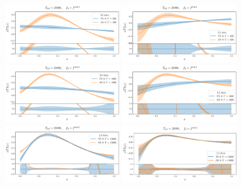   \begin{figure}[ht!]
    \centering
    \includegraphics[width=0.45\textwidth]{plots/analytical_solution/evolution_vs_trained_epoch_500_L0.pdf} \hspace{10mm}
    \includegraphics[width=0.45\textwidth]{plots/analytical_solution/evolution_vs_trained_epoch_500_L2.pdf}
    \includegraphics[width=0.45\textwidth]{plots/analytical_solution/evolution_vs_trained_epoch_1000_L0.pdf} \hspace{10mm}
    \includegraphics[width=0.45\textwidth]{plots/analytical_solution/evolution_vs_trained_epoch_1000_L2.pdf}
    \includegraphics[width=0.45\textwidth]{plots/analytical_solution/evolution_vs_trained_epoch_10000_L0.pdf} \hspace{10mm}
    \includegraphics[width=0.45\textwidth]{plots/analytical_solution/evolution_vs_trained_epoch_10000_L2.pdf}

\end{figure}
